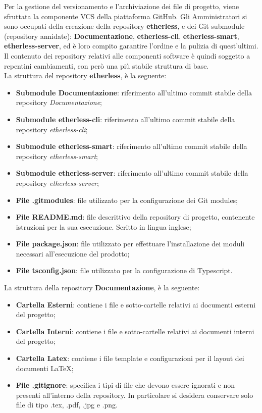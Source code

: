 			Per la gestione del versionamento e l'archiviazione dei file di progetto, viene sfruttata la componente VCS della piattaforma GitHub. Gli Amministratori si sono occupati della creazione della repository \textbf{etherless}, e dei Git submodule (repository annidate): \textbf{Documentazione}, \textbf{etherless-cli}, \textbf{etherless-smart}, \textbf{etherless-server},  ed è loro compito garantire l'ordine e la pulizia di quest'ultimi. Il contenuto dei repository relativi alle componenti software è quindi soggetto a repentini cambiamenti, con però una più stabile struttura di base.\\
			La struttura del repository \textbf{etherless}, è la seguente:
			\begin{itemize}
				\item \textbf{Submodule Documentazione}: riferimento all'ultimo commit stabile della repository \textit{Documentazione};
				\item \textbf{Submodule etherless-cli}: riferimento all'ultimo commit stabile della repository \textit{etherless-cli};
				\item \textbf{Submodule etherless-smart}: riferimento all'ultimo commit stabile della repository \textit{etherless-smart};
				\item \textbf{Submodule etherless-server}: riferimento all'ultimo commit stabile della repository \textit{etherless-server};
				\item \textbf{File .gitmodules}: file utilizzato per la configurazione dei Git modules;
				\item \textbf{File README.md}: file descrittivo della repository di progetto, contenente istruzioni per la sua esecuzione. Scritto in lingua inglese;
				\item \textbf{File package.json}: file utilizzato per effettuare l'installazione dei moduli necessari all'esecuzione del prodotto;
				\item \textbf{File tsconfig.json}: file utilizzato per la configurazione di Typescript.
			\end{itemize}
			La struttura della repository \textbf{Documentazione}, è la seguente:
			\begin{itemize}
				\item \textbf{Cartella Esterni}: contiene i file e sotto-cartelle relativi ai documenti esterni del progetto;
				\item \textbf{Cartella Interni}: contiene i file e sotto-cartelle relativi ai documenti interni del progetto;
				\item \textbf{Cartella Latex}: contiene i file template e configurazioni per il layout dei documenti \LaTeX{};
				\item \textbf{File .gitignore}: specifica i tipi di file che devono essere ignorati e non presenti all'interno della repository. In particolare si desidera conservare solo file di tipo .tex, .pdf, .jpg e .png.
			\end{itemize}
